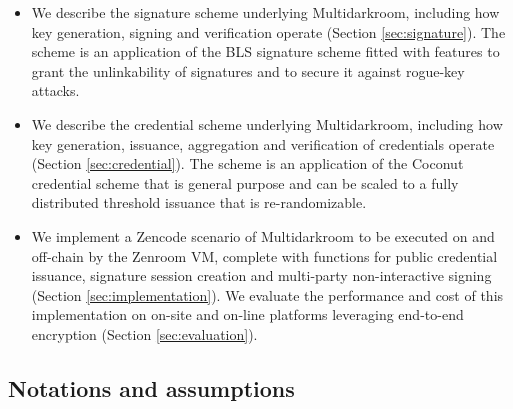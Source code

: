 \documentclass[twocolumn]{article}
\begin{document}
\begin{itemize}
\item We describe the signature scheme underlying Multidarkroom, including how
  key generation, signing and verification operate (Section
  \ref{sec:signature}). The scheme is an application of the BLS signature scheme
  \citep{asiacrypt-bls} fitted with features to grant the unlinkability of
  signatures and to secure it against rogue-key attacks.
\item We describe the credential scheme underlying Multidarkroom, including how
  key generation, issuance, aggregation and verification of credentials operate
  (Section \ref{sec:credential}). The scheme is an application of the Coconut
  credential scheme \citep{coconut-2018} that is general purpose and can be
  scaled to a fully distributed threshold issuance that is re-randomizable.
\item We implement a Zencode scenario of Multidarkroom to be executed on and
  off-chain by the Zenroom VM, complete with functions for public credential
  issuance, signature session creation and multi-party non-interactive signing
  (Section \ref{sec:implementation}). We evaluate the performance and cost of
  this implementation on on-site and on-line platforms leveraging end-to-end
  encryption (Section \ref{sec:evaluation}).
\end{itemize}

\subsection*{Notations and assumptions}
\end{document}
